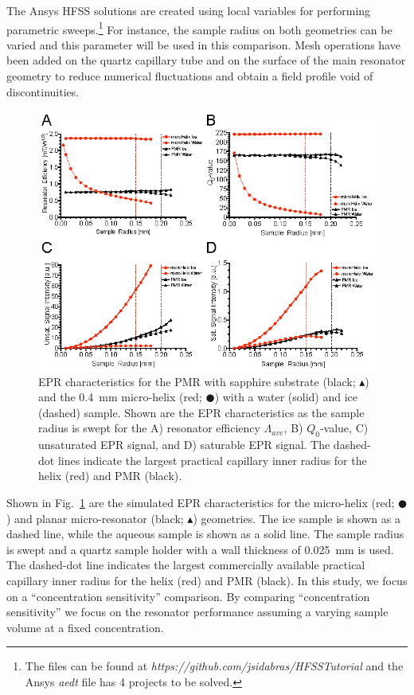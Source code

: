 The Ansys HFSS solutions are created using local variables for performing parametric sweeps.\footnote{The files can be found at \textit{https://github.com/jsidabras/HFSSTutorial} and the Ansys \textit{aedt} file has 4 projects to be solved.} For instance, the sample radius on both geometries can be varied and this parameter will be used in this comparison. Mesh operations have been added on the quartz capillary tube and on the surface of the main resonator geometry to reduce numerical fluctuations and obtain a field profile void of discontinuities. 

\begin{figure}[ht]
 \centering
 \includegraphics[width=\textwidth]{Kapitel/Ch2-Images/Ch2-SweepOutput.eps}
 \caption[EPR characteristics as the sample radius is swept.]{EPR characteristics for the PMR with sapphire substrate (black; $\blacktriangle$) and the 0.4~mm micro-helix (red; $\CIRCLE$) with a water (solid) and ice (dashed) sample. Shown are the EPR characteristics as the sample radius is swept for the A) resonator efficiency $\Lambda_{ave}$, B) $Q_0$-value, C) unsaturated EPR signal, and D) saturable EPR signal. The dashed-dot lines indicate the largest practical capillary inner radius for the helix (red) and PMR (black).}
 \label{fig:SweptData}
\end{figure}

Shown in Fig.~\ref{fig:SweptData} are the simulated EPR characteristics for the micro-helix (red; $\CIRCLE$) and planar micro-resonator (black; $\blacktriangle$) geometries. The ice sample is shown as a dashed line, while the aqueous sample is shown as a solid line. The sample radius is swept and a quartz sample holder with a wall thickness of 0.025~mm is used. The dashed-dot line indicates the largest commercially available practical capillary inner radius for the helix (red) and PMR (black). In this study, we focus on a ``concentration sensitivity'' comparison. By comparing ``concentration sensitivity'' we focus on the resonator performance assuming a varying sample volume at a fixed concentration.

